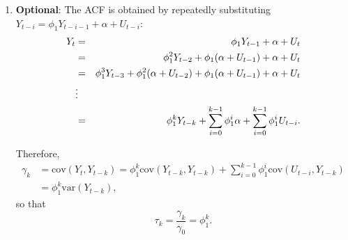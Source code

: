 \documentclass[11pt, a4paper]{article}
\begin{document}
\begin{enumerate}
\begin{enumerate}
\item \textbf{Optional}:
The ACF is obtained by repeatedly
substituting $Y_{t-i} = \phi_1 Y_{t-i-1} + \alpha + U_{t-i}$:
\begin{eqnarray}
Y_t &=&\phi_1 Y_{t-1}+ \alpha + U_t  \notag \\
&=&\phi_1 ^2Y_{t-2} + \phi_1 (\alpha + U_{t-1}) + \alpha + U_t  \notag \\
&=&\phi_1 ^3 Y_{t-3}+ \phi_1 ^2 (\alpha + U_{t-2} )+ \phi_1 (\alpha + U_{t-1})+
\alpha + U_t  \notag \\
&\vdots &  \notag \\
&=&\phi_1 ^k Y_{t-k}+\sum_{i=0}^{k-1}\phi_1 ^i \alpha + \sum_{i=0}^{k-1}\phi_1
^i U_{t-i}.  \label{subst}
\end{eqnarray}

Therefore,
\begin{align*}
\gamma_k &= \mathrm{cov}(Y_t,Y_{t-k}) = \phi_1 ^k \mathrm{cov}%
(Y_{t-k},Y_{t-k}) + \sum_{i=0}^{k-1}\phi_1 ^i \mathrm{cov}(U_{t-i},Y_{t-k})\\
&= \phi_1 ^k \mathrm{var}(Y_{t-k}),
\end{align*}
so that
\begin{equation*}
\tau_k = \frac{\gamma_k}{\gamma_0} = \phi_1 ^k.
\end{equation*}

\end{enumerate}
\end{enumerate}
\end{document}
